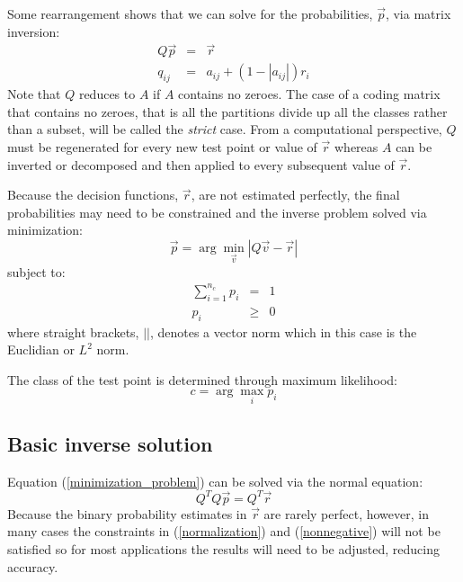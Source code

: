 \documentclass{article}
\begin{document}
Some rearrangement shows that
we can solve for the probabilities, $\vec p$, via matrix inversion:
\begin{eqnarray}
	Q \vec p & = & \vec r \label{basic_system}\\
	q_{ij} & = & a_{ij} + (1-|a_{ij}|) r_i 
	\label{matrix_equation2}
\end{eqnarray}
Note that $Q$ reduces to $A$ if $A$ contains no zeroes.
The case of a coding matrix that contains no zeroes, that is all the partitions divide up all the
classes rather than a subset, will be called the {\it strict} case.
From a computational perspective, 
$Q$ must be regenerated for every new test point or value of $\vec r$ 
whereas $A$ can be inverted or decomposed and then
applied to every subsequent value of $\vec r$.

Because the decision functions, $\vec r$, are not estimated perfectly,
the final probabilities may need to be constrained and the inverse
problem solved via minimization:
\begin{equation}
	\vec p = \arg \min_{\vec v} | Q \vec v - \vec r | \label{minimization_problem}
\end{equation}
subject to:
\begin{eqnarray}
	\sum_{i=1}^{n_c} p_i & = & 1 \label{normalization}\\
	p_i & \ge & 0 \label{nonnegative}
\end{eqnarray}
where straight brackets, $||$, denotes a vector norm which  
in this case is the Euclidian or $L^2$ norm.

The class of the test point is determined through maximum likelihood:
\begin{equation}
	c = \arg \max_i p_i
\end{equation}

\subsection{Basic inverse solution}

Equation (\ref{minimization_problem}) can be solved via the normal
equation:
\begin{equation}
	Q^T Q \vec p = Q^T \vec r
	\label{normal_equation}
\end{equation}
Because the binary probability estimates in $\vec r$ are rarely perfect, however,
in many cases the constraints in (\ref{normalization}) and (\ref{nonnegative}) will not be satisfied 
so for most applications the results will need to be adjusted, reducing accuracy.
\end{document}
